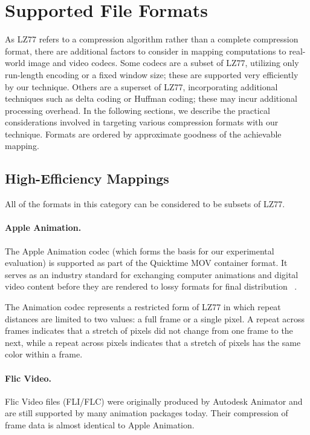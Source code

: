 \section{Supported File Formats}
\label{sec:formats}

As LZ77 refers to a compression algorithm rather than a complete
compression format, there are additional factors to consider in
mapping computations to real-world image and video codecs.  Some
codecs are a subset of LZ77, utilizing only run-length encoding or a
fixed window size; these are supported very efficiently by our
technique.  Others are a superset of LZ77, incorporating additional
techniques such as delta coding or Huffman coding; these may incur
additional processing overhead.  In the following sections, we
describe the practical considerations involved in targeting various
compression formats with our technique.  Formats are ordered by
approximate goodness of the achievable mapping.

\subsection{High-Efficiency Mappings}
\label{sec:formats-good}

All of the formats in this category can be considered to be subsets of
LZ77.

\paragraph{Apple Animation.}  
The Apple Animation codec (which forms the basis for our experimental
evaluation) is supported as part of the Quicktime MOV container
format.  It serves as an industry standard for exchanging computer
animations and digital video content before they are rendered to lossy
formats for final distribution~\cite[p.~106]{adobe-anim}\cite[p.~284]{harrington-anim} \cite[p.~367]{long-anim}\cite[p.~280]{pogue-anim}.

The Animation codec represents a restricted form of LZ77 in which
repeat distances are limited to two values: a full frame or a single
pixel.  A repeat across frames indicates that a stretch of pixels did
not change from one frame to the next, while a repeat across pixels
indicates that a stretch of pixels has the same color within a frame.

\paragraph{Flic Video.}
Flic Video files (FLI/FLC) were originally produced by Autodesk
Animator and are still supported by many animation packages today.
Their compression of frame data is almost identical to Apple
Animation.

